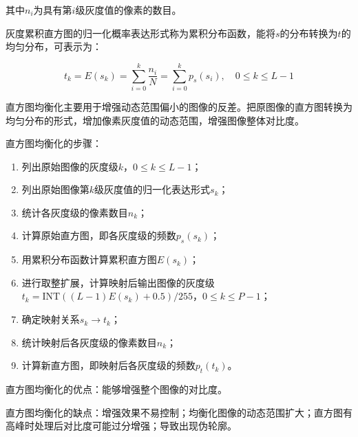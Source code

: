 \documentclass[cn, blue, normal, 12pt]{elegantnote}
\begin{document}
{其中$n_i$为具有第$i$级灰度值的像素的数目。

灰度累积直方图的归一化概率表达形式称为累积分布函数，能将$s$的分布转换为$t$的均匀分布，可表示为：

\begin{equation}
    t_k=E(s_k)=\sum_{i=0}^{k}\frac{n_i}{N}=\sum_{i=0}^{k}p_s(s_i), \quad 0\leq k \leq L-1
\end{equation}

直方图均衡化主要用于增强动态范围偏小的图像的反差。把原图像的直方图转换为均匀分布的形式，增加像素灰度值的动态范围，增强图像整体对比度。

直方图均衡化的步骤：

\begin{enumerate}
    \item 列出原始图像的灰度级$k$，$0\leq k \leq L-1$；
    \item 列出原始图像第$k$级灰度值的归一化表达形式$s_k$；
    \item 统计各灰度级的像素数目$n_k$；
    \item 计算原始直方图，即各灰度级的频数$p_s(s_k)$；
    \item 用累积分布函数计算累积直方图$E(s_k)$；
    \item 进行取整扩展，计算映射后输出图像的灰度级$t_k=\text{INT}((L-1)E(s_k)+0.5)/255$，$0\leq k \leq P-1$；
    \item 确定映射关系$s_k\rightarrow t_k$；
    \item 统计映射后各灰度级的像素数目$n_k$；
    \item 计算新直方图，即映射后各灰度级的频数$p_t(t_k)$。
\end{enumerate}


直方图均衡化的优点：能够增强整个图像的对比度。

直方图均衡化的缺点：增强效果不易控制；均衡化图像的动态范围扩大；直方图有高峰时处理后对比度可能过分增强；导致出现伪轮廓。

}
\end{document}

